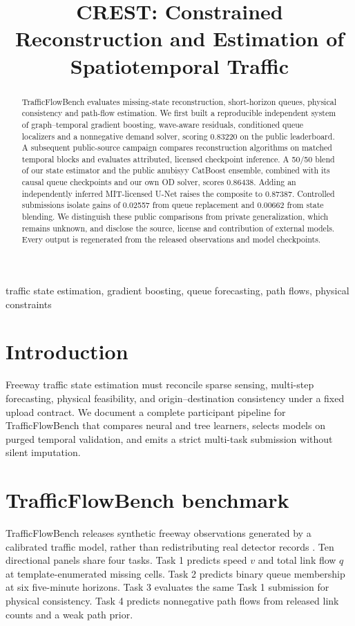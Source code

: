 \documentclass[conference]{IEEEtran}
\title{CREST: Constrained Reconstruction and Estimation of Spatiotemporal Traffic}
\author{\IEEEauthorblockN{Arjun Vijay Prakash}\IEEEauthorblockA{Independent Researcher}}
\begin{document}
\maketitle
\begin{abstract}
TrafficFlowBench evaluates missing-state reconstruction, short-horizon queues,
physical consistency and path-flow estimation. We first built a reproducible
independent system of graph--temporal gradient boosting, wave-aware residuals,
conditioned queue localizers and a nonnegative demand solver, scoring 0.83220
on the public leaderboard. A subsequent public-source campaign compares
reconstruction algorithms on matched temporal blocks and evaluates attributed,
licensed checkpoint inference. A 50/50 blend of our state estimator and the
public anubisyy CatBoost ensemble, combined with its causal queue checkpoints
and our own OD solver, scores 0.86438. Adding an independently inferred MIT-licensed U-Net raises the composite to 0.87387. Controlled submissions isolate gains of
0.02557 from queue replacement and 0.00662 from state blending. We distinguish
these public comparisons from private generalization, which remains unknown,
and disclose the source, license and contribution of external models. Every
output is regenerated from the released observations and model checkpoints.
\end{abstract}
\begin{IEEEkeywords}
traffic state estimation, gradient boosting, queue forecasting, path flows, physical constraints
\end{IEEEkeywords}

\section{Introduction}
Freeway traffic state estimation must reconcile sparse sensing, multi-step
forecasting, physical feasibility, and origin--destination consistency under
a fixed upload contract. We document a complete participant pipeline for
TrafficFlowBench that compares neural and tree learners, selects models on
purged temporal validation, and emits a strict multi-task submission without
silent imputation.

\section{TrafficFlowBench benchmark}
TrafficFlowBench releases synthetic freeway observations generated by a
calibrated traffic model, rather than redistributing real detector records
\cite{bench}. Ten directional panels share four tasks. Task 1 predicts speed
$v$ and total link flow $q$ at template-enumerated missing cells. Task 2 predicts
binary queue membership at six five-minute horizons. Task 3 evaluates the same
Task 1 submission for physical consistency. Task 4 predicts nonnegative path
flows from released link counts and a weak path prior.
\end{document}
